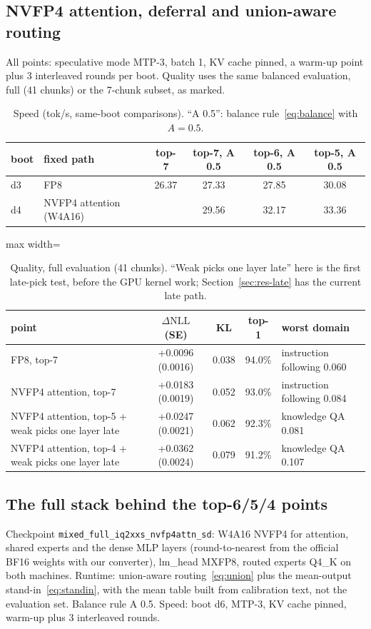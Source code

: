 \documentclass[11pt]{article}
\newcommand{\dNLL}{\Delta\mathrm{NLL}}
\begin{document}
\FloatBarrier
\subsection{NVFP4 attention, deferral and union-aware routing}
\label{sec:res-nvfp4}
All points: speculative mode MTP-3, batch 1, KV cache pinned, a warm-up point plus 3 interleaved rounds per boot.
Quality uses the same balanced evaluation, full (41 chunks) or the 7-chunk subset, as marked.

\begin{table}[h]
\centering\small
\caption{Speed (tok/s, same-boot comparisons). ``A 0.5'': balance rule~\eqref{eq:balance} with $A = 0.5$.}
\label{tab:d3d4}
\begin{tabular}{llcccc}
\toprule
boot & fixed path & top-7 & top-7, A 0.5 & top-6, A 0.5 & top-5, A 0.5 \\
\midrule
d3 & FP8 & 26.37 & 27.33 & 27.85 & 30.08 \\
d4 & NVFP4 attention (W4A16) & & 29.56 & 32.17 & 33.36 \\
\bottomrule
\end{tabular}
\end{table}

\begin{table}[h]
\centering\small
\caption{Quality, full evaluation (41 chunks). ``Weak picks one layer late'' here is the first late-pick test, before
the GPU kernel work; Section~\ref{sec:res-late} has the current late path.}
\label{tab:dq}
\begin{adjustbox}{max width=\linewidth}
\begin{tabular}{lcccl}
\toprule
point & $\dNLL$ (SE) & KL & top-1 & worst domain \\
\midrule
FP8, top-7 & +0.0096 (0.0016) & 0.038 & 94.0\% & instruction following 0.060 \\
NVFP4 attention, top-7 & +0.0183 (0.0019) & 0.052 & 93.0\% & instruction following 0.084 \\
NVFP4 attention, top-5 + weak picks one layer late & +0.0247 (0.0021) & 0.062 & 92.3\% & knowledge QA 0.081 \\
NVFP4 attention, top-4 + weak picks one layer late & +0.0362 (0.0024) & 0.079 & 91.2\% & knowledge QA 0.107 \\
\bottomrule
\end{tabular}
\end{adjustbox}
\end{table}

\FloatBarrier
\subsection{The full stack behind the top-6/5/4 points}
\label{sec:res-stack}
Checkpoint \texttt{mixed\_full\_iq2xxs\_nvfp4attn\_sd}: W4A16 NVFP4 for attention, shared experts and the dense MLP
layers (round-to-nearest from the official BF16 weights with our converter), lm\_head MXFP8, routed experts Q4\_K on
both machines. Runtime: union-aware routing~\eqref{eq:union} plus the mean-output stand-in~\eqref{eq:standin}, with the
mean table built from calibration text, not the evaluation set. Balance rule A 0.5. Speed: boot d6, MTP-3, KV cache
pinned, warm-up plus 3 interleaved rounds.
\end{document}
